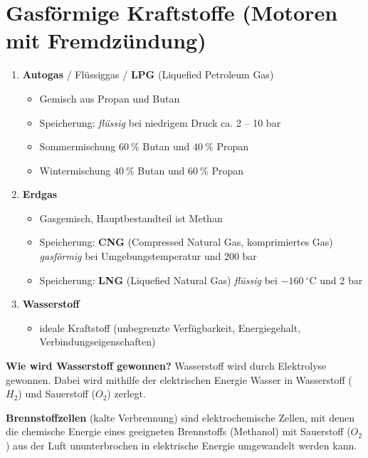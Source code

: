 \section{Gasförmige Kraftstoffe (Motoren mit
Fremdzündung)}\label{gasfoermige-kraftstoffe-motoren-mit-fremdzuendung}

\begin{enumerate}
\item
  \textbf{Autogas} / Flüssiggas / \textbf{LPG} (Liquefied Petroleum Gas)

  \begin{itemize}
  \item
    Gemisch aus Propan und Butan
  \item
    Speicherung: \emph{flüssig} bei niedrigem Druck ca. 2 -- 10 bar
  \item
    Sommermischung $60~\%$ Butan und $40~\%$ Propan
  \item
    Wintermischung $40~\%$ Butan und $60~\%$ Propan
  \end{itemize}
\item
  \textbf{Erdgas}

  \begin{itemize}
  \item
    Gasgemisch, Hauptbestandteil ist Methan
  \item
    Speicherung: \textbf{CNG} (Compressed Natural Gas, komprimiertes
    Gas) \emph{gasförmig} bei Umgebungstemperatur und 200 bar
  \item
    Speicherung: \textbf{LNG} (Liquefied Natural Gas) \emph{flüssig} bei
    $- 160~^\circ\text{C}$ und 2 bar
  \end{itemize}
\item
  \textbf{Wasserstoff}

  \begin{itemize}
  \item
    ideale Kraftstoff (unbegrenzte Verfügbarkeit, Energiegehalt,
    Verbindungseigenschaften)
  \end{itemize}
\end{enumerate}

\textbf{Wie wird Wasserstoff gewonnen?} Wasserstoff wird durch
Elektrolyse gewonnen. Dabei wird mithilfe der elektrischen Energie
Wasser in Wasserstoff ($H_2$) und Sauerstoff ($O_2$) zerlegt.

\textbf{Brennstoffzellen} (kalte Verbrennung) sind elektrochemische
Zellen, mit denen die chemische Energie eines geeigneten Brennstoffs
(Methanol) mit Sauerstoff ($O_2$) aus der Luft ununterbrochen in
elektrische Energie umgewandelt werden kann.

